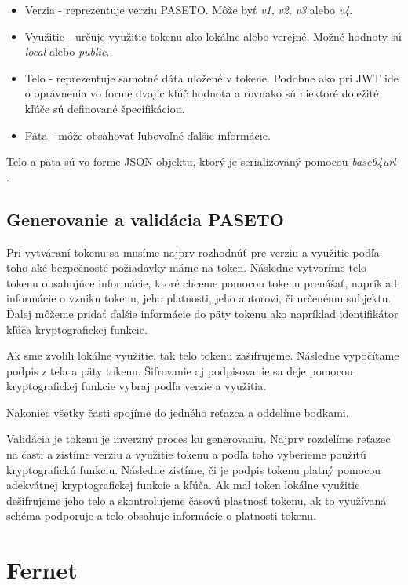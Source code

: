 \begin{itemize}
    \item Verzia - reprezentuje verziu PASETO. Môže byť \textit{v1}, \textit{v2}, \textit{v3} alebo \textit{v4}.
    \item Využitie - určuje využitie tokenu ako lokálne alebo verejné. Možné hodnoty sú \textit{local} alebo \textit{public}.
    \item Telo - reprezentuje samotné dáta uložené v tokene. Podobne ako pri JWT ide o oprávnenia vo forme dvojíc kľúč hodnota a rovnako sú niektoré doležité kľúče sú definované špecifikáciou. \cite{paseto_git}
    \item Päta - môže obsahovať ľubovoľné ďalšie informácie.
\end{itemize}

Telo a päta sú vo forme JSON objektu, ktorý je serializovaný pomocou \textit{base64url} \cite{base64_rfc}.

\subsection{Generovanie a validácia PASETO}

Pri vytváraní tokenu sa musíme najprv rozhodnúť pre verziu a využitie podľa toho aké bezpečnosté požiadavky máme na token. Následne vytvoríme telo tokenu obsahujúce informácie, ktoré chceme pomocou tokenu prenášať, napríklad informácie o vzniku tokenu, jeho platnosti, jeho autorovi, či určenému subjektu. Ďalej môžeme pridať ďalšie informácie do päty tokenu ako napríklad identifikátor kľúča kryptografickej funkcie. 

Ak sme zvolili lokálne využitie, tak telo tokenu zašifrujeme. Následne vypočítame podpis z tela a päty tokenu. Šifrovanie aj podpisovanie sa deje pomocou kryptografickej funkcie vybraj podľa verzie a využitia.

Nakoniec všetky časti spojíme do jedného reťazca a oddelíme bodkami.

Validácia je tokenu je inverzný proces ku generovaniu. Najprv rozdelíme reťazec na časti a zistíme verziu a využitie tokenu a podľa toho vyberieme použitú kryptografickú funkciu. Následne zistíme, či je podpis tokenu platný pomocou adekvátnej kryptografickej funkcie a kľúča. Ak mal token lokálne využitie dešifrujeme jeho telo a skontrolujeme časovú plastnosť tokenu, ak to využívaná schéma podporuje a telo obsahuje informácie o platnosti tokenu.

\section{Fernet}

